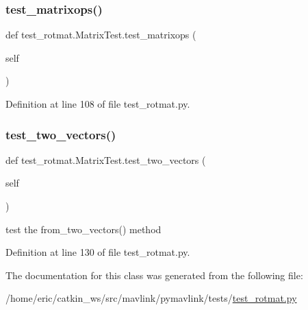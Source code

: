 \subsubsection{\texorpdfstring{test\_matrixops()}{test\_matrixops()}}
{\footnotesize\ttfamily def test\+\_\+rotmat.\+Matrix\+Test.\+test\+\_\+matrixops (\begin{DoxyParamCaption}\item[{}]{self }\end{DoxyParamCaption})}



Definition at line 108 of file test\+\_\+rotmat.\+py.

\mbox{\label{classtest__rotmat_1_1MatrixTest_a02d650c3e419de814138dd31a224651e}} 
\subsubsection{\texorpdfstring{test\_two\_vectors()}{test\_two\_vectors()}}
{\footnotesize\ttfamily def test\+\_\+rotmat.\+Matrix\+Test.\+test\+\_\+two\+\_\+vectors (\begin{DoxyParamCaption}\item[{}]{self }\end{DoxyParamCaption})}

\begin{DoxyVerb}test the from_two_vectors() method\end{DoxyVerb}
 

Definition at line 130 of file test\+\_\+rotmat.\+py.



The documentation for this class was generated from the following file\+:\begin{DoxyCompactItemize}
\item 
/home/eric/catkin\+\_\+ws/src/mavlink/pymavlink/tests/\mbox{\hyperlink{test__rotmat_8py}{test\+\_\+rotmat.\+py}}\end{DoxyCompactItemize}
